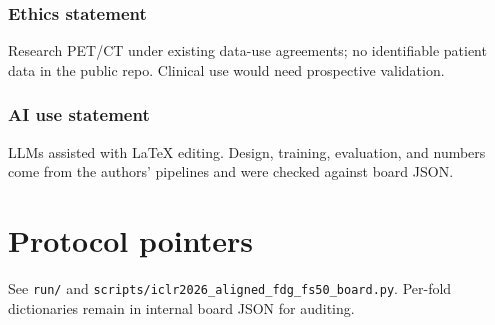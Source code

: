 \documentclass{article} %
\begin{document}
\subsubsection*{Ethics statement}
Research PET/CT under existing data-use agreements; no identifiable patient data
in the public repo. Clinical use would need prospective validation.

\subsubsection*{AI use statement}
LLMs assisted with LaTeX editing. Design, training, evaluation, and numbers come
from the authors' pipelines and were checked against board JSON.




\appendix
\section{Protocol pointers}
See \texttt{run/} and \texttt{scripts/iclr2026\_aligned\_fdg\_fs50\_board.py}.
Per-fold dictionaries remain in internal board JSON for auditing.
\end{document}
